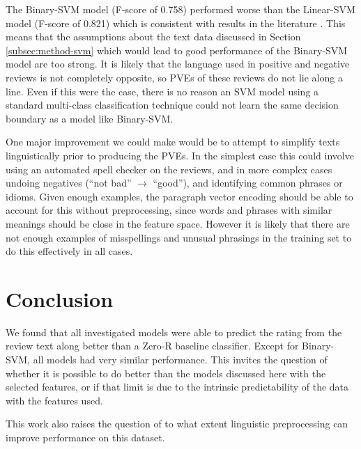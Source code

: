 \documentclass[11pt]{article}
\begin{document}
The Binary-SVM model (F-score of 0.758) performed worse than the Linear-SVM model (F-score of 0.821) which is consistent with results in the literature \cite{koppel_importance_2006}. This means that the assumptions about the text data discussed in Section \ref{subsec:method-svm} which would lead to good performance of the Binary-SVM model are too strong. It is likely that the language used in positive and negative reviews is not completely opposite, so PVEs of these reviews do not lie along a line. Even if this were the case, there is no reason an SVM model using a standard multi-class classification technique could not learn the same decision boundary as a model like Binary-SVM.

One major improvement we could make would be to attempt to simplify texts linguistically prior to producing the PVEs. In the simplest case this could involve using an automated spell checker on the reviews, and in more complex cases undoing negatives (``not bad'' $\rightarrow$ ``good''), and identifying common phrases or idioms. Given enough examples, the paragraph vector encoding should be able to account for this without preprocessing, since words and phrases with similar meanings should be close in the feature space. However it is likely that there are not enough examples of misspellings and unusual phrasings in the training set to do this effectively in all cases.

\section{Conclusion}
We found that all investigated models were able to predict the rating from the review text along better than a Zero-R baseline classifier. Except for Binary-SVM, all models had very similar performance. This invites the question of whether it is possible to do better than the models discussed here with the selected features, or if that limit is due to the intrinsic predictability of the data with the features used. 

This work also raises the question of to what extent linguistic preprocessing can improve performance on this dataset.


\nocite{mukherjee_what_2013}
\nocite{rayana_collective_2015}

\nocite{sklearn_pedregosa_scikit-learn_2011}
\nocite{gensim_rehurek_software_2010}


\end{document}
